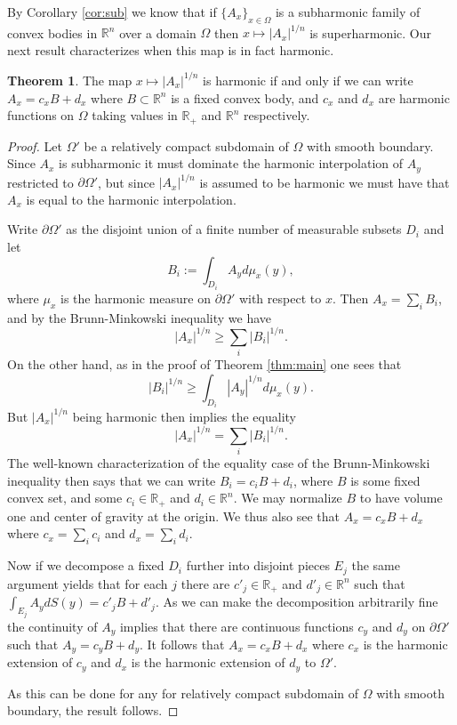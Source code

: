 \documentclass[reqno]{amsart}
\theoremstyle{definition}
\newtheorem{theorem}{Theorem}[section]
\theoremstyle{definition}
\theoremstyle{definition}
\begin{document}
By Corollary \ref{cor:sub} we know that if $\{A_x\}_{x\in \Omega}$ is a subharmonic family of convex bodies in $\mathbb R^n$ over a domain $\Omega$ then $x\mapsto |A_x|^{1/n}$ is superharmonic.   Our next result characterizes when this map is in fact harmonic.

\begin{theorem}
The map $x\mapsto |A_x|^{1/n}$ is harmonic if and only if we can write $A_x=c_xB+d_x$ where $B\subset \mathbb R^n$ is a fixed convex body, and $c_x$ and $d_x$ are harmonic functions on $\Omega$ taking values in $\mathbb{R}_+$ and $\mathbb{R}^n$ respectively. 
\end{theorem}

\begin{proof}
Let $\Omega'$ be a relatively compact subdomain of $\Omega$ with smooth boundary. Since $A_x$ is subharmonic it must dominate the harmonic interpolation of $A_y$ restricted to $\partial \Omega'$, but since $|A_x|^{1/n}$ is assumed to be harmonic we must have that $A_x$ is equal to the harmonic interpolation.

Write $\partial \Omega'$ as the disjoint union of a finite number of measurable subsets $D_i$ and let $$B_i:=\int_{D_i}A_yd\mu_x(y),$$ where $\mu_x$ is the harmonic measure on $\partial \Omega'$ with respect to $x$. Then  $A_x=\sum_iB_i$, and by the Brunn-Minkowski inequality we have $$|A_x|^{1/n}\geq \sum_i|B_i|^{1/n}.$$ On the other hand, as in the proof of Theorem \ref{thm:main} one sees that $$|B_i|^{1/n}\geq \int_{D_i}|A_y|^{1/n}d\mu_x(y).$$ But $|A_x|^{1/n}$ being harmonic then implies the equality $$|A_x|^{1/n}= \sum_i|B_i|^{1/n}.$$ The well-known characterization of the equality case of the Brunn-Minkowski inequality then says that we can write $B_i=c_iB+d_i$, where $B$ is some fixed convex set, and some $c_i\in \mathbb{R}_+$ and $d_i\in \mathbb{R}^n$. We may normalize $B$ to have volume one and center of gravity at the origin. We thus also see that $A_x=c_xB+d_x$ where $c_x=\sum_ic_i$ and $d_x=\sum_i d_i$. 

Now if we decompose a fixed $D_i$ further into disjoint pieces $E_j$ the same argument yields that for each $j$ there are $c'_j\in \mathbb{R}_+$ and $d'_j\in \mathbb{R}^n$ such that $\int_{E_j}A_ydS(y)=c'_jB+d'_j$. As we can make the decomposition arbitrarily fine the continuity of $A_y$ implies that there are continuous functions $c_y$ and $d_y$ on $\partial \Omega'$ such that $A_y=c_yB+d_y$. It follows that $A_x=c_xB+d_x$ where $c_x$ is the harmonic extension of $c_y$ and $d_x$ is the harmonic extension of $d_y$ to $\Omega'$.

As this can be done for any for relatively compact subdomain of $\Omega$ with smooth boundary, the result follows. 
\end{proof}
\end{document}
